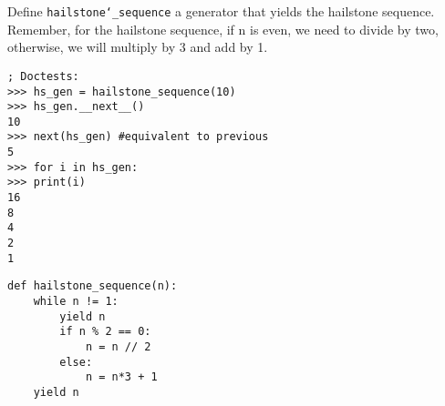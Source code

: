 \question Define \texttt{hailstone\char`_sequence} a generator that yields the
hailstone sequence. Remember, for the hailstone sequence, if n is even, we need
to divide by two, otherwise, we will multiply by 3 and add by 1.

\begin{lstlisting}
; Doctests:
>>> hs_gen = hailstone_sequence(10)
>>> hs_gen.__next__()
10
>>> next(hs_gen) #equivalent to previous
5
>>> for i in hs_gen:
>>>	print(i)
16
8
4
2
1
\end{lstlisting}

\begin{solution}[1.5in]
\begin{lstlisting}
def hailstone_sequence(n):
	while n != 1:
		yield n
		if n % 2 == 0:
			n = n // 2
		else:
			n = n*3 + 1
	yield n
\end{lstlisting}
\end{solution}

